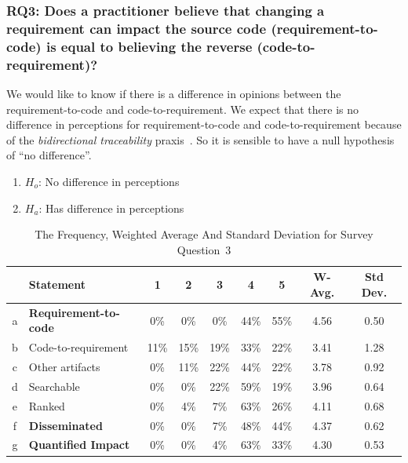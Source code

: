 \documentclass[conference]{IEEEtran}
\begin{document}
\subsubsection{RQ3: Does a practitioner believe that changing a
  requirement can impact the source code (requirement-to-code) is
  equal to believing the reverse (code-to-requirement)?}

We would like to know if there is a difference in opinions between the
requirement-to-code and code-to-requirement. We expect that there is
no difference in perceptions for requirement-to-code and
code-to-requirement because of the \emph{bidirectional traceability}
praxis~\cite{ProductCMMIfor2010}. So it is sensible to have a null
hypothesis of ``no difference''.

\begin{enumerate}[ ] 
\item $H_o$: No difference in perceptions 
\item $H_a$: Has difference in perceptions
\end{enumerate} 

\begin{table}
\caption{The Frequency, Weighted Average And Standard Deviation for Survey Question~3}
\label{statisticsquestion3}
\centering
\begin{tabular}{|c|l|c|c|c|c|c|c|c|}
\hline
\rowcolor{lightgray} &  Statement  &  1 & 2 & 3 & 4 & 5 & W-Avg. & Std Dev.  
\\
\hline
a & \textbf{Requirement-to-code}   & 0\% & 0\% & 0\% & 44\% & 55\% & 4.56 & 0.50 
\\
\hline
b & Code-to-requirement  & 11\% & 15\% & 19\% & 33\% & 22\% & 3.41 & 1.28
\\
\hline
c & Other artifacts       & 0\% & 11\% & 22\% & 44\% & 22\% & 3.78 & 0.92
\\
\hline
d & Searchable            & 0\% & 0\% & 22\% & 59\% & 19\% & 3.96 & 0.64
\\
\hline
e & Ranked                & 0\% & 4\% & 7\% & 63\% & 26\% & 4.11 & 0.68
\\
\hline
f & \textbf{Disseminated}          & 0\% & 0\% & 7\% & 48\% & 44\% & 4.37 & 0.62
\\
\hline
g & \textbf{Quantified Impact}             & 0\% & 0\% & 4\% & 63\% & 33\% & 4.30 & 0.53
\\
\hline
 
\end{tabular}
\end{table}
\end{document}
